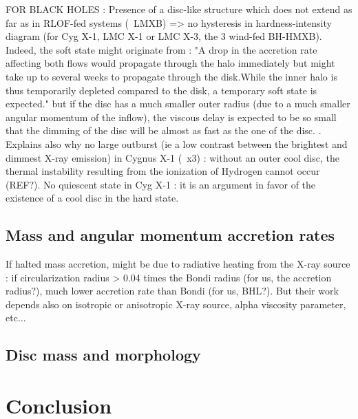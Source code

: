 \documentclass[a4paper,fleqn,usenatbib]{article}
\begin{document}
FOR BLACK HOLES :
Presence of a disc-like structure which does not extend as far as in RLOF-fed systems (~LMXB) => no hysteresis in hardness-intensity diagram (for Cyg X-1, LMC X-1 or LMC X-3, the 3 wind-fed BH-HMXB). Indeed, the soft state might originate from : "A drop in the accretion rate affecting both flows would propagate through the halo immediately but might take up to several weeks to propagate through the disk.While the inner halo is thus temporarily depleted compared to the disk, a temporary soft state is expected." but if the disc has a much smaller outer radius (due to a much smaller angular momentum of the inflow), the viscous delay is expected to be so small that the dimming of the disc will be almost as fast as the one of the disc. \citep{Smith2002}. Explains also why no large outburst (ie a low contrast between the brightest and dimmest X-ray emission) in Cygnus X-1 (~x3) \citep{Grinberg:2014ux} : without an outer cool disc, the thermal instability resulting from the ionization of Hydrogen cannot occur (REF?). No quiescent state in Cyg X-1 : it is an argument in favor of the existence of a cool disc in the hard state.

\subsection{Mass and angular momentum accretion rates}
\label{sec:mdot_ldot}

If halted mass accretion, might be due to radiative heating from the X-ray source \citep{Sugimura2018} : if circularization radius > 0.04 times the Bondi radius (for us, the accretion radius?), much lower accretion rate than Bondi (for us, BHL?). But their work depends also on isotropic or anisotropic X-ray source, alpha viscosity parameter, etc...

\subsection{Disc mass and morphology}
\label{sec:disc}

\section{Conclusion}
\label{sec:conc}
\end{document}
